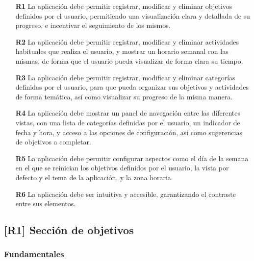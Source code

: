\documentclass[10pt, a4paper]{aqademic}
\begin{document}
\begin{itemize}
	\item[\textbf{R1}] La aplicación debe permitir registrar, modificar y eliminar objetivos definidos por el usuario, permitiendo una visualización clara y detallada de su progreso, e incentivar el seguimiento de los mismos.
	
	\item[\textbf{R2}] La aplicación debe permitir registrar, modificar y eliminar actividades habituales que realiza el usuario, y mostrar un horario semanal con las mismas, de forma que el usuario pueda visualizar de forma clara su tiempo.
	
	\item[\textbf{R3}] La aplicación debe permitir registrar, modificar y eliminar categorías definidas por el usuario, para que pueda organizar sus objetivos y actividades de forma temática, así como visualizar su progreso de la misma manera.
	
	\item[\textbf{R4}] La aplicación debe mostrar un panel de navegación entre las diferentes vistas, con una lista de categorías definidas por el usuario, un indicador de fecha y hora, y acceso a las opciones de configuración, así como sugerencias de objetivos a completar.
	
	\item[\textbf{R5}] La aplicación debe permitir configurar aspectos como el día de la semana en el que se reinician los objetivos definidos por el usuario, la vista por defecto y el tema de la aplicación, y la zona horaria.
	
	\item[\textbf{R6}] La aplicación debe ser intuitiva y accesible, garantizando el contraste entre sus elementos.
\end{itemize}


\subsection*{[R1] Sección de objetivos}

\subsubsection*{Fundamentales}
\end{document}
